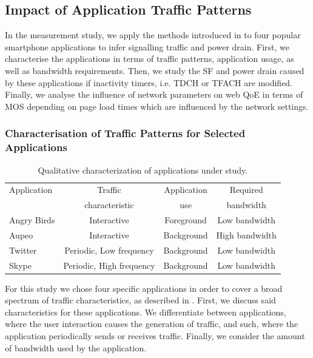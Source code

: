 \subsection{Impact of Application Traffic Patterns}\label{sec:network:network_traces:numerical_results}
In the measurement study, we apply the methods introduced in  to four popular smartphone
applications to infer signalling traffic and power drain.
First, we characterise the applications in terms of traffic patterns, application usage, as well as bandwidth requirements.
Then, we study the \gls{SF} and power drain caused by these applications if inactivity timers, i.e. \gls{TDCH} or \gls{TFACH} are modified.
Finally, we analyse the influence of network parameters on web \gls{QoE} in terms of \gls{MOS} depending on page load times which are influenced by the network settings.

\subsubsection*{Characterisation of Traffic Patterns for Selected Applications}\label{sec:network:network_traces:numerical_results:traffic_characterization}

\begin{table}
  \centering
  \caption{Qualitative characterization of applications under study.}
  \label{tab:network:network_traces:numerical_results:app_characterization}
  \begin{tabular}{lccc}
  	\toprule
    Application&Traffic&Application&Required\\
    &characteristic&use&bandwidth\\
    \midrule
    Angry Birds & Interactive & Foreground & Low bandwidth \\
    Aupeo & Interactive & Background & High bandwidth\\
    Twitter & Periodic, Low frequency & Background & Low bandwidth\\
    Skype & Periodic, High frequency& Background & Low bandwidth\\
    \bottomrule
  \end{tabular}
\end{table}

For this study we chose four specific applications in order to cover a broad spectrum of traffic characteristics, as described in .
First, we discuss said characteristics for these applications.
We differentiate between applications, where the user interaction causes the generation of traffic, and such, where the application periodically sends or receives traffic.
Finally, we consider the amount of bandwidth used by the application.

